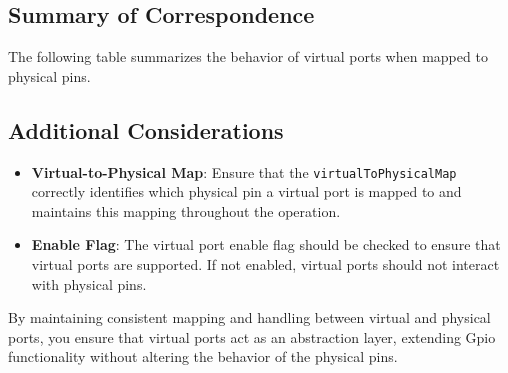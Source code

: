 \subsection{Summary of Correspondence}
The following table summarizes the behavior of virtual ports when mapped to physical pins.
\begin{table}[ht]
    \centering
    \caption{Virtual Port Behavior Correspondence with Physical Pins}
\end{table}

\subsection{Additional Considerations}

\begin{itemize}[noitemsep]
    \item \textbf{Virtual-to-Physical Map}: Ensure that the \texttt{virtualToPhysicalMap} correctly identifies which physical pin a virtual port is mapped to and maintains this mapping throughout the operation.
    \item \textbf{Enable Flag}: The virtual port enable flag should be checked to ensure that virtual ports are supported. If not enabled, virtual ports should not interact with physical pins.
\end{itemize}

By maintaining consistent mapping and handling between virtual and physical ports, you ensure that virtual ports act as an abstraction layer, extending Gpio functionality without altering the behavior of the physical pins.
